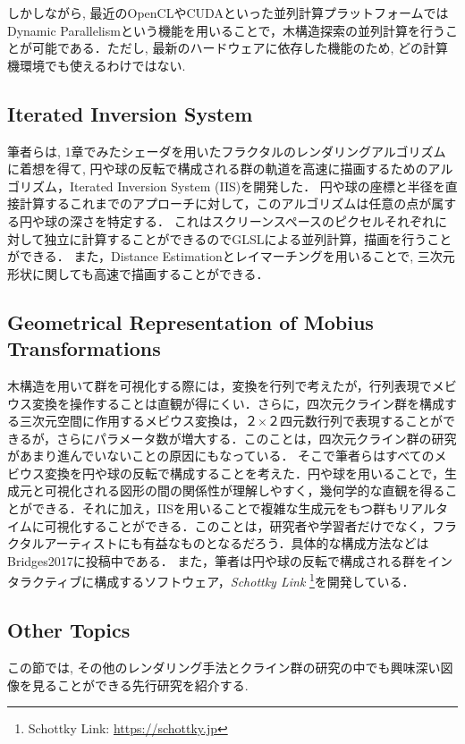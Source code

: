しかしながら, 最近のOpenCLやCUDAといった並列計算プラットフォームではDynamic Parallelismという機能を用いることで，木構造探索の並列計算を行うことが可能である．ただし, 最新のハードウェアに依存した機能のため, どの計算機環境でも使えるわけではない.

\subsection{Iterated Inversion System}

筆者らは, 1章でみたシェーダを用いたフラクタルのレンダリングアルゴリズムに着想を得て, 円や球の反転で構成される群の軌道を高速に描画するためのアルゴリズム，Iterated Inversion System (IIS)\cite{iis}を開発した．
円や球の座標と半径を直接計算するこれまでのアプローチに対して，このアルゴリズムは任意の点が属する円や球の深さを特定する．
これはスクリーンスペースのピクセルそれぞれに対して独立に計算することができるのでGLSLによる並列計算，描画を行うことができる．
また，Distance Estimationとレイマーチングを用いることで, 三次元形状に関しても高速で描画することができる．

\subsection{Geometrical Representation of Mobius Transformations}

木構造を用いて群を可視化する際には，変換を行列で考えたが，行列表現でメビウス変換を操作することは直観が得にくい．さらに，四次元クライン群を構成する三次元空間に作用するメビウス変換は，２×２四元数行列で表現することができるが，さらにパラメータ数が増大する．このことは，四次元クライン群の研究があまり進んでいないことの原因にもなっている．
そこで筆者らはすべてのメビウス変換を円や球の反転で構成することを考えた．円や球を用いることで，生成元と可視化される図形の間の関係性が理解しやすく，幾何学的な直観を得ることができる．それに加え，IISを用いることで複雑な生成元をもつ群もリアルタイムに可視化することができる．このことは，研究者や学習者だけでなく，フラクタルアーティストにも有益なものとなるだろう．具体的な構成方法などはBridges2017に投稿中である．
また，筆者は円や球の反転で構成される群をインタラクティブに構成するソフトウェア，{\it Schottky Link} \footnote{Schottky Link: \url{https://schottky.jp}}を開発している．

\subsection{Other Topics}

この節では, その他のレンダリング手法とクライン群の研究の中でも興味深い図像を見ることができる先行研究を紹介する.

